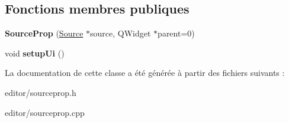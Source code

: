 \subsection*{Fonctions membres publiques}
\begin{DoxyCompactItemize}
\item 
\hypertarget{classSourceProp_ae2499296312b5f80c8dac887fa36008e}{{\bfseries Source\+Prop} (\hyperlink{classSource}{Source} $\ast$source, Q\+Widget $\ast$parent=0)}\label{classSourceProp_ae2499296312b5f80c8dac887fa36008e}

\item 
\hypertarget{classSourceProp_aa77a6eec73ae9dc526fc7cbc8f24138a}{void {\bfseries setup\+Ui} ()}\label{classSourceProp_aa77a6eec73ae9dc526fc7cbc8f24138a}

\end{DoxyCompactItemize}


La documentation de cette classe a été générée à partir des fichiers suivants \+:\begin{DoxyCompactItemize}
\item 
editor/sourceprop.\+h\item 
editor/sourceprop.\+cpp\end{DoxyCompactItemize}

